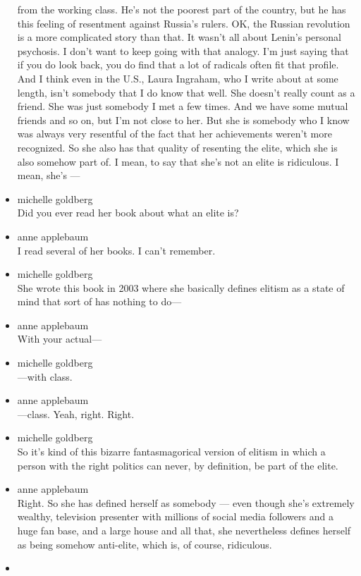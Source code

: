 \begin{itemize}
  from the working class. He's not the poorest part of the country, but
  he has this feeling of resentment against Russia's rulers. OK, the
  Russian revolution is a more complicated story than that. It wasn't
  all about Lenin's personal psychosis. I don't want to keep going with
  that analogy. I'm just saying that if you do look back, you do find
  that a lot of radicals often fit that profile. And I think even in the
  U.S., Laura Ingraham, who I write about at some length, isn't somebody
  that I do know that well. She doesn't really count as a friend. She
  was just somebody I met a few times. And we have some mutual friends
  and so on, but I'm not close to her. But she is somebody who I know
  was always very resentful of the fact that her achievements weren't
  more recognized. So she also has that quality of resenting the elite,
  which she is also somehow part of. I mean, to say that she's not an
  elite is ridiculous. I mean, she's ---
\item
  michelle goldberg\\
  Did you ever read her book about what an elite is?
\item
  anne applebaum\\
  I read several of her books. I can't remember.
\item
  michelle goldberg\\
  She wrote this book in 2003 where she basically defines elitism as a
  state of mind that sort of has nothing to do---
\item
  anne applebaum\\
  With your actual---
\item
  michelle goldberg\\
  ---with class.
\item
  anne applebaum\\
  ---class. Yeah, right. Right.
\item
  michelle goldberg\\
  So it's kind of this bizarre fantasmagorical version of elitism in
  which a person with the right politics can never, by definition, be
  part of the elite.
\item
  anne applebaum\\
  Right. So she has defined herself as somebody --- even though she's
  extremely wealthy, television presenter with millions of social media
  followers and a huge fan base, and a large house and all that, she
  nevertheless defines herself as being somehow anti-elite, which is, of
  course, ridiculous.
\item

\end{itemize}
